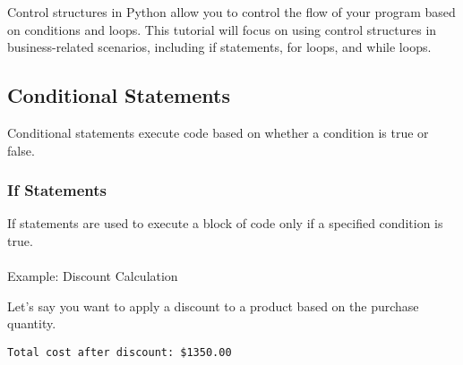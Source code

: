 \documentclass[
  letterpaper,
  DIV=11,
  numbers=noendperiod]{scrreprt}
\makeatletter
\let\oldparagraph\paragraph
\renewcommand{\paragraph}{
    \@ifstar
      \xxxParagraphStar
      \xxxParagraphNoStar
  }
\newcommand{\xxxParagraphStar}[1]{\oldparagraph*{#1}\mbox{}}
\newcommand{\xxxParagraphNoStar}[1]{\oldparagraph{#1}\mbox{}}
\newenvironment{Shaded}{\begin{snugshade}}{\end{snugshade}}
\newcommand{\BuiltInTok}[1]{\textcolor[rgb]{0.00,0.23,0.31}{#1}}
\newcommand{\CommentTok}[1]{\textcolor[rgb]{0.37,0.37,0.37}{#1}}
\newcommand{\ControlFlowTok}[1]{\textcolor[rgb]{0.00,0.23,0.31}{\textbf{#1}}}
\newcommand{\DecValTok}[1]{\textcolor[rgb]{0.68,0.00,0.00}{#1}}
\newcommand{\FloatTok}[1]{\textcolor[rgb]{0.68,0.00,0.00}{#1}}
\newcommand{\NormalTok}[1]{\textcolor[rgb]{0.00,0.23,0.31}{#1}}
\newcommand{\OperatorTok}[1]{\textcolor[rgb]{0.37,0.37,0.37}{#1}}
\newcommand{\SpecialCharTok}[1]{\textcolor[rgb]{0.37,0.37,0.37}{#1}}
\newcommand{\SpecialStringTok}[1]{\textcolor[rgb]{0.13,0.47,0.30}{#1}}
\makeatother
\begin{document}
Control structures in Python allow you to control the flow of your
program based on conditions and loops. This tutorial will focus on using
control structures in business-related scenarios, including if
statements, for loops, and while loops.

\subsection{Conditional Statements}\label{conditional-statements-2}

Conditional statements execute code based on whether a condition is true
or false.

\subsubsection{If Statements}\label{if-statements}

If statements are used to execute a block of code only if a specified
condition is true.

\paragraph{Example: Discount
Calculation}\label{example-discount-calculation}

Let's say you want to apply a discount to a product based on the
purchase quantity.

\begin{Shaded}
\end{Shaded}

\begin{verbatim}
Total cost after discount: $1350.00
\end{verbatim}
\end{document}
